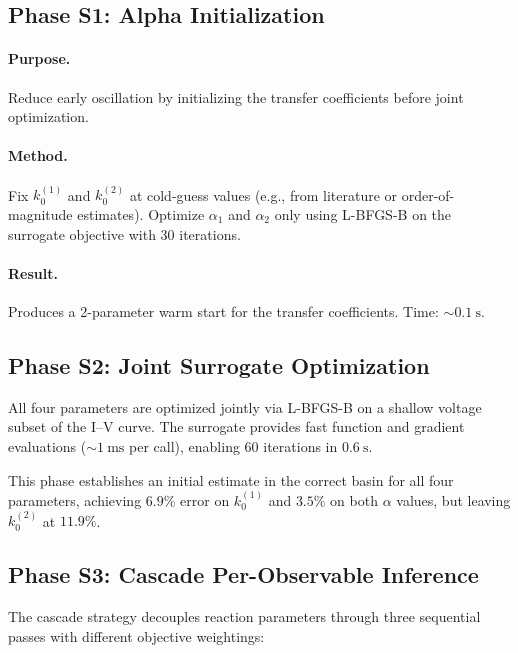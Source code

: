 \documentclass[11pt,a4paper]{article}
\newcommand{\kzero}{k_0}
\begin{document}
\subsection{Phase S1: Alpha Initialization}\label{sec:S1}

\paragraph{Purpose.} Reduce early oscillation by initializing the
transfer coefficients before joint optimization.

\paragraph{Method.} Fix $\kzero^{(1)}$ and $\kzero^{(2)}$ at cold-guess
values (e.g., from literature or order-of-magnitude estimates).
Optimize $\alpha_1$ and $\alpha_2$ only using L-BFGS-B on the surrogate
objective with 30 iterations.

\paragraph{Result.} Produces a 2-parameter warm start for the transfer
coefficients. Time: $\sim\!\SI{0.1}{\second}$.

\subsection{Phase S2: Joint Surrogate Optimization}\label{sec:S2}

All four parameters are optimized jointly via L-BFGS-B on a shallow
voltage subset of the I--V curve. The surrogate provides fast function
and gradient evaluations ($\sim\!\SI{1}{\milli\second}$ per call),
enabling 60 iterations in $\SI{0.6}{\second}$.

This phase establishes an initial estimate in the correct basin for
all four parameters, achieving $6.9\%$ error on $\kzero^{(1)}$ and
$3.5\%$ on both $\alpha$ values, but leaving $\kzero^{(2)}$ at $11.9\%$.

\subsection{Phase S3: Cascade Per-Observable Inference}\label{sec:cascade}

The cascade strategy decouples reaction parameters through three
sequential passes with different objective weightings:
\end{document}
